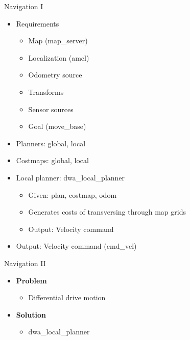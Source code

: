 \begin{frame}{Navigation I}
\begin{itemize}
	\item Requirements
		\begin{itemize}
			\item Map (map\_server)
			\item Localization (amcl)
			\item Odometry source
			\item Transforms
			\item Sensor sources
			\item Goal (move\_base) 
		\end{itemize}
	\item Planners: global, local
	\item Costmaps: global, local
	\item Local planner: dwa\_local\_planner
		\begin{itemize}
			\item Given: plan, costmap, odom
			\item Generates costs of transversing through map grids
			\item Output: Velocity command
		\end{itemize} 
	\item Output: Velocity command (cmd\_vel)
\end{itemize}
\end{frame}
\begin{frame}{Navigation II}
\begin{itemize}
	\item \textbf{Problem}
		\begin{itemize}
			\item Differential drive motion
		\end{itemize}
	\item \textbf{Solution}
		\begin{itemize}
			\item dwa\_local\_planner
		\end{itemize}
\end{itemize}

\end{frame}

